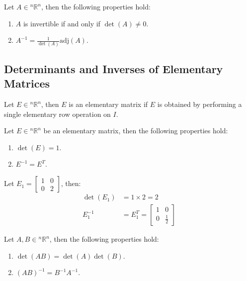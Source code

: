 \documentclass[11pt]{article}
\begin{document}
\begin{theorem}
    Let $A \in  {^n\mathbb{R}^n}$, then the following properties hold:
    \begin{enumerate}
        \item $A$ is invertible if and only if $\det(A) \neq 0$.
        \item $A^{-1} = \frac{1}{\det(A)}\text{adj}(A)$.
    \end{enumerate}
\end{theorem}
\subsection{Determinants and Inverses of Elementary Matrices}
\begin{definition}
    Let $E \in  {^n\mathbb{R}^n}$, then $E$ is an elementary matrix if $E$ is obtained by performing a single elementary row operation on $I$.
\end{definition}
\begin{theorem}
    Let $E \in  {^n\mathbb{R}^n}$ be an elementary matrix, then the following properties hold:
    \begin{enumerate}
        \item $\det(E) = 1$.
        \item $E^{-1} = E^T$.
    \end{enumerate}
\end{theorem}
\begin{example}
    Let $E_1 = \begin{bmatrix} 1 & 0 \\ 0 & 2 \end{bmatrix}$, then:
    \begin{align*}
        \det(E_1) &= 1 \times 2 = 2 \\
        E_1^{-1} &= E_1^T = \begin{bmatrix} 1 & 0 \\ 0 & \frac{1}{2} \end{bmatrix}
    \end{align*}
\end{example}
\begin{theorem}
    Let $A, B \in  {^n\mathbb{R}^n}$, then the following properties hold:
    \begin{enumerate}
        \item $\det(AB) = \det(A)\det(B)$.
        \item $(AB)^{-1} = B^{-1}A^{-1}$.
    \end{enumerate}
\end{theorem}
\end{document}
